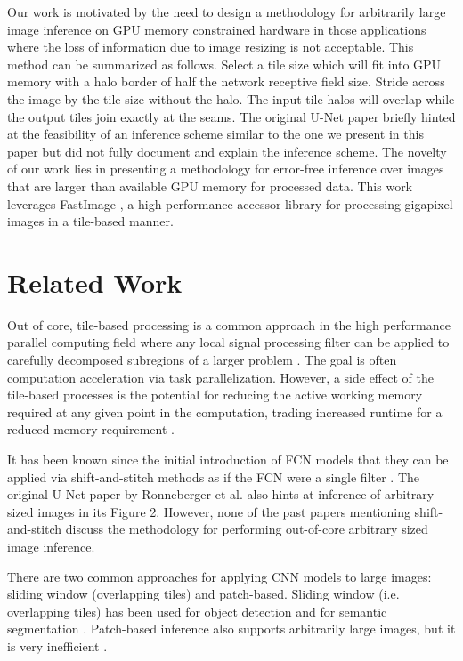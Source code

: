\documentclass[runningheads]{llncs}
\begin{document}
Our work is motivated by the need to design a methodology for arbitrarily large image inference on GPU memory constrained hardware in those applications where the loss of information due to image resizing is not acceptable. This method can be summarized as follows. Select a tile size which will fit into GPU memory with a halo border of half the network receptive field size. Stride across the image by the tile size without the halo. The input tile halos will overlap while the output tiles join exactly at the seams. 
The original U-Net paper \cite{Ronneberger2015a} briefly hinted at the feasibility of an inference scheme similar to the one we present in this paper but did not fully document and explain the inference scheme. 
The novelty of our work lies in presenting a methodology for error-free inference over images that are larger than available GPU memory for processed data. This work leverages FastImage \cite{Bardakoff2019}, a high-performance accessor library for processing gigapixel images in a tile-based manner.

\section{Related Work}
\label{related-work}

Out of core, tile-based processing is a common approach in the high performance parallel computing field where any local signal processing filter can be applied to carefully decomposed subregions of a larger problem \cite{Blattner2017}. The goal is often computation acceleration via task parallelization. However, a side effect of the tile-based processes is the potential for reducing the active working memory required at any given point in the computation, trading increased runtime for a reduced memory requirement \cite{Blattner2017}.

It has been known since the initial introduction of FCN models that they can be applied via shift-and-stitch methods as if the FCN were a single filter \cite{Long2015,Sherrah2016}.
The original U-Net paper by Ronneberger et al. \cite{Ronneberger2015a} also hints at inference of arbitrary sized images in its Figure 2. However, none of the past papers mentioning shift-and-stitch discuss the methodology for performing out-of-core arbitrary sized image inference.

There are two common approaches for applying CNN models to large images: sliding window (overlapping tiles) and patch-based. Sliding window (i.e. overlapping tiles) has been used for object detection \cite{Sermanet2013,VanEtten2019} and for semantic segmentation \cite{Lin2019,Volpi2017a}. Patch-based inference also supports arbitrarily large images, but it is very inefficient \cite{Volpi2017a,Maggiori2016}.
\end{document}
